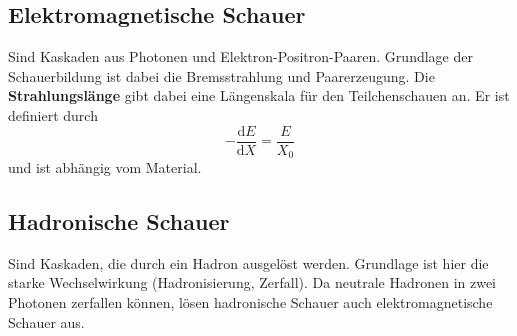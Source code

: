 \subsection{Elektromagnetische Schauer}
Sind Kaskaden aus Photonen und Elektron-Positron-Paaren.
Grundlage der Schauerbildung ist dabei die Bremsstrahlung und Paarerzeugung.
Die \textbf{Strahlungslänge} gibt dabei eine Längenskala für den Teilchenschauen an.
Er ist definiert durch
\begin{equation*}
	-\frac{\text{d}E}{\text{d}X} = \frac{E}{X_0}
\end{equation*}
und ist abhängig vom Material.

\subsection{Hadronische Schauer}
Sind Kaskaden, die durch ein Hadron ausgelöst werden.
Grundlage ist hier die starke Wechselwirkung (Hadronisierung, Zerfall).
Da neutrale Hadronen in zwei Photonen zerfallen können, lösen hadronische Schauer auch elektromagnetische Schauer aus.
